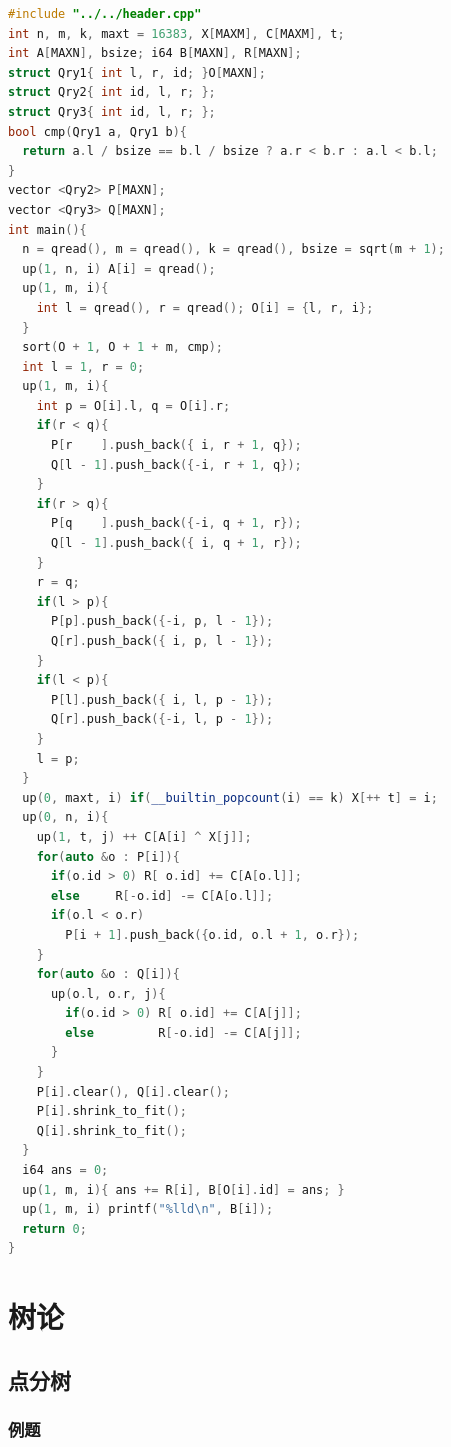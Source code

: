\documentclass[10pt]{ctexart}
\begin{document}
\begin{multicols}{3}
\begin{lstlisting}[language={C++}]
#include "../../header.cpp"
int n, m, k, maxt = 16383, X[MAXM], C[MAXM], t;
int A[MAXN], bsize; i64 B[MAXN], R[MAXN];
struct Qry1{ int l, r, id; }O[MAXN];
struct Qry2{ int id, l, r; };
struct Qry3{ int id, l, r; };
bool cmp(Qry1 a, Qry1 b){
  return a.l / bsize == b.l / bsize ? a.r < b.r : a.l < b.l;
}
vector <Qry2> P[MAXN];
vector <Qry3> Q[MAXN];
int main(){
  n = qread(), m = qread(), k = qread(), bsize = sqrt(m + 1);
  up(1, n, i) A[i] = qread();
  up(1, m, i){
    int l = qread(), r = qread(); O[i] = {l, r, i};
  }
  sort(O + 1, O + 1 + m, cmp);
  int l = 1, r = 0;
  up(1, m, i){
    int p = O[i].l, q = O[i].r;
    if(r < q){
      P[r    ].push_back({ i, r + 1, q});
      Q[l - 1].push_back({-i, r + 1, q});
    }
    if(r > q){
      P[q    ].push_back({-i, q + 1, r});
      Q[l - 1].push_back({ i, q + 1, r});
    }
    r = q;
    if(l > p){
      P[p].push_back({-i, p, l - 1});
      Q[r].push_back({ i, p, l - 1});
    }
    if(l < p){
      P[l].push_back({ i, l, p - 1});
      Q[r].push_back({-i, l, p - 1});
    }
    l = p;
  }
  up(0, maxt, i) if(__builtin_popcount(i) == k) X[++ t] = i;
  up(0, n, i){
    up(1, t, j) ++ C[A[i] ^ X[j]];
    for(auto &o : P[i]){
      if(o.id > 0) R[ o.id] += C[A[o.l]];
      else     R[-o.id] -= C[A[o.l]];
      if(o.l < o.r)
        P[i + 1].push_back({o.id, o.l + 1, o.r});
    }
    for(auto &o : Q[i]){
      up(o.l, o.r, j){
        if(o.id > 0) R[ o.id] += C[A[j]];
        else         R[-o.id] -= C[A[j]];
      }
    }
    P[i].clear(), Q[i].clear();
    P[i].shrink_to_fit();
    Q[i].shrink_to_fit();
  }
  i64 ans = 0;
  up(1, m, i){ ans += R[i], B[O[i].id] = ans; }
  up(1, m, i) printf("%lld\n", B[i]);
  return 0;
}
\end{lstlisting}

    \section{树论}\label{ux6811ux8bba}

    \subsection{点分树}\label{ux70b9ux5206ux6811}

    \subsubsection{例题}\label{ux4f8bux9898-3}


\end{multicols}
\end{document}
